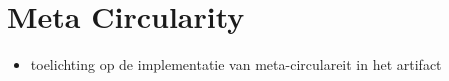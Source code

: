 \section{Meta Circularity} \label{sec_artifact_meta_Circularity}

\begin{itemize}
    \item toelichting op de implementatie van meta-circulareit in het artifact
\end{itemize}